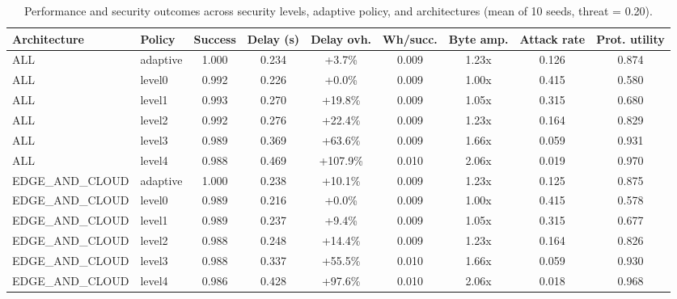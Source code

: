 \begin{table}
\centering
\small
\caption{Performance and security outcomes across security levels, adaptive policy, and architectures (mean of 10 seeds, threat = 0.20).}
\label{tab:p4-main}
\begin{tabular}{llccccccc}
\toprule
Architecture & Policy & Success & Delay (s) & Delay ovh. & Wh/succ. & Byte amp. & Attack rate & Prot. utility \\
\midrule
ALL & adaptive & 1.000 & 0.234 & +3.7\% & 0.009 & 1.23x & 0.126 & 0.874 \\
ALL & level0 & 0.992 & 0.226 & +0.0\% & 0.009 & 1.00x & 0.415 & 0.580 \\
ALL & level1 & 0.993 & 0.270 & +19.8\% & 0.009 & 1.05x & 0.315 & 0.680 \\
ALL & level2 & 0.992 & 0.276 & +22.4\% & 0.009 & 1.23x & 0.164 & 0.829 \\
ALL & level3 & 0.989 & 0.369 & +63.6\% & 0.009 & 1.66x & 0.059 & 0.931 \\
ALL & level4 & 0.988 & 0.469 & +107.9\% & 0.010 & 2.06x & 0.019 & 0.970 \\
EDGE\_AND\_CLOUD & adaptive & 1.000 & 0.238 & +10.1\% & 0.009 & 1.23x & 0.125 & 0.875 \\
EDGE\_AND\_CLOUD & level0 & 0.989 & 0.216 & +0.0\% & 0.009 & 1.00x & 0.415 & 0.578 \\
EDGE\_AND\_CLOUD & level1 & 0.989 & 0.237 & +9.4\% & 0.009 & 1.05x & 0.315 & 0.677 \\
EDGE\_AND\_CLOUD & level2 & 0.988 & 0.248 & +14.4\% & 0.009 & 1.23x & 0.164 & 0.826 \\
EDGE\_AND\_CLOUD & level3 & 0.988 & 0.337 & +55.5\% & 0.010 & 1.66x & 0.059 & 0.930 \\
EDGE\_AND\_CLOUD & level4 & 0.986 & 0.428 & +97.6\% & 0.010 & 2.06x & 0.018 & 0.968 \\
\bottomrule
\end{tabular}
\par\vspace{2pt}{\footnotesize\raggedright Delay ovh. is relative to L0 (none); Prot. utility = success ratio $\times$ (1 $-$ composite attack rate).\par}
\end{table}
